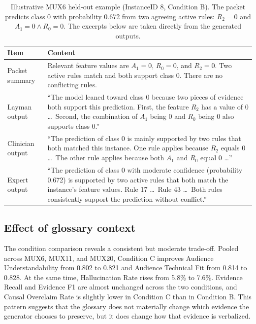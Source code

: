 \documentclass[sigconf,nonacm]{acmart}
\begin{document}
\begin{table}[t]
\caption{Illustrative MUX6 held-out example (InstanceID 8, Condition B). The packet predicts class 0 with probability 0.672 from two agreeing active rules: $R_2 = 0$ and $A_1 = 0 \wedge R_0 = 0$. The excerpts below are taken directly from the generated outputs.}
\label{tab:mux6-example}
\centering
\small
\begin{tabular}{p{2.3cm}p{13.2cm}}
\toprule
\textbf{Item} & \textbf{Content} \\
\midrule
Packet summary & Relevant feature values are $A_1 = 0$, $R_0 = 0$, and $R_2 = 0$. Two active rules match and both support class 0. There are no conflicting rules. \\
Layman output & ``The model leaned toward class 0 because two pieces of evidence both support this prediction. First, the feature $R_2$ has a value of 0 \ldots\ Second, the combination of $A_1$ being 0 and $R_0$ being 0 also supports class 0.'' \\
Clinician output & ``The prediction of class 0 is mainly supported by two rules that both matched this instance. One rule applies because $R_2$ equals 0 \ldots\ The other rule applies because both $A_1$ and $R_0$ equal 0 \ldots'' \\
Expert output & ``The prediction of class 0 with moderate confidence (probability 0.672) is supported by two active rules that both match the instance's feature values. Rule 17 \ldots\ Rule 43 \ldots\ Both rules consistently support the prediction without conflict.'' \\
\bottomrule
\end{tabular}
\end{table}

\subsection{Effect of glossary context}
The condition comparison reveals a consistent but moderate trade-off. Pooled across MUX6, MUX11, and MUX20, Condition C improves Audience Understandability from 0.802 to 0.821 and Audience Technical Fit from 0.814 to 0.828. At the same time, Hallucination Rate rises from 5.8\% to 7.6\%. Evidence Recall and Evidence F1 are almost unchanged across the two conditions, and Causal Overclaim Rate is slightly lower in Condition C than in Condition B. This pattern suggests that the glossary does not materially change which evidence the generator chooses to preserve, but it does change how that evidence is verbalized.
\end{document}
